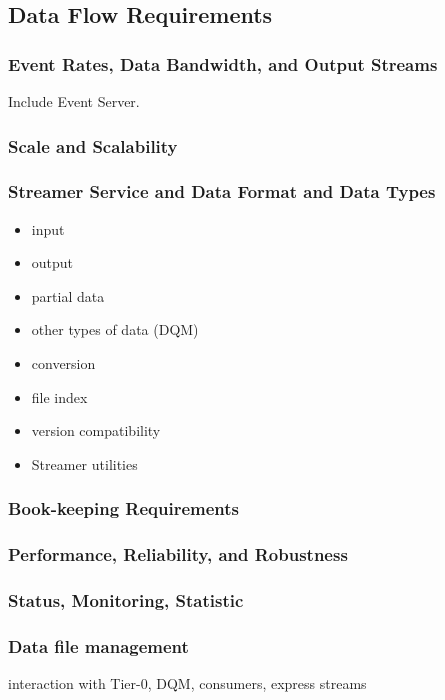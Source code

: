\subsection{Data Flow Requirements}

\subsubsection{Event Rates, Data Bandwidth, and Output Streams}

Include Event Server.

\subsubsection{Scale and Scalability}

\subsubsection{Streamer Service and Data Format and Data Types}
 
\begin{itemize}
\item
input
\item
output
\item
partial data
\item
other types of data (DQM)
\item
conversion
\item
file index
\item
version compatibility
\item
Streamer utilities
\end{itemize}
   
\subsubsection{Book-keeping Requirements}

\subsubsection{Performance, Reliability, and Robustness}

\subsubsection{Status, Monitoring, Statistic}

\subsubsection{Data file management}

interaction with Tier-0, DQM, consumers, express streams